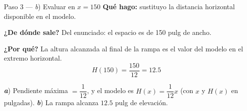 \documentclass[11pt]{article}
\begin{document}
\begin{paso}{Paso 3 --- \textit{b}) Evaluar en $x=150$}
\textbf{Qué hago:} sustituyo la distancia horizontal disponible en el modelo.

\textbf{¿De dónde sale?} Del enunciado: el espacio es de 150 pulg de ancho.

\textbf{¿Por qué?} La altura alcanzada al final de la rampa es el valor del modelo en el extremo horizontal.
\[
H(150)=\frac{150}{12}=12.5
\]
\end{paso}

\begin{resp}
\textbf{\textit{a}}) Pendiente máxima $=\dfrac{1}{12}$, y el modelo es $H(x)=\dfrac{1}{12}x$ (con $x$ y $H(x)$ en pulgadas). \quad \textbf{\textit{b}}) La rampa alcanza $12.5$ pulg de elevación.
\end{resp}
\end{document}
